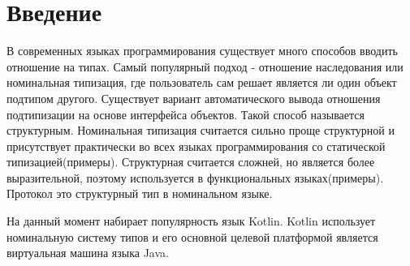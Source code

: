 \documentclass{spbau-diploma}
\begin{document}
\maketitle
\tableofcontents
\section*{Введение}
В современных языках программирования существует много способов вводить отношение на типах. Самый популярный подход - отношение наследования или номинальная типизация, где пользователь сам решает является ли один объект подтипом другого. Существует вариант автоматического вывода отношения подтипизации на основе интерфейса объектов. Такой способ называется структурным. Номинальная типизация считается сильно проще структурной и присутствует практически во всех языках программирования со статической типизацией(примеры). Структурная считается сложней, но является более выразительной, поэтому используется в функциональных языках(примеры). Протокол это структурный тип в номинальном языке.

На данный момент набирает популярность язык Kotlin. Kotlin использует номинальную систему типов и его основной целевой платформой является виртуальная машина языка Java.
\end{document}
